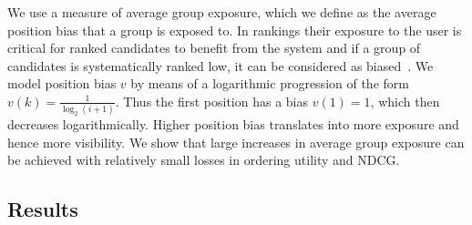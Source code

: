  We use a measure of average group exposure, which we define as the average position bias that a group is exposed to. 
%
In rankings their exposure to the user is critical for ranked candidates to benefit from the system and if a group of candidates is systematically ranked low, it can be considered as biased~\cite{friedman1996bias}. 
%
We model position bias $v$ by means of a logarithmic progression of the form $v(k) = \frac{1}{\log_2(i+1)}$. 
%
Thus the first position has a bias $v(1)=1$, which then decreases logarithmically.
%
Higher position bias translates into more exposure and hence more visibility.
%
We show that large increases in average group exposure can be achieved with relatively small losses in ordering utility and NDCG.

\subsection{Results}\label{sec:experiments-results}
%
